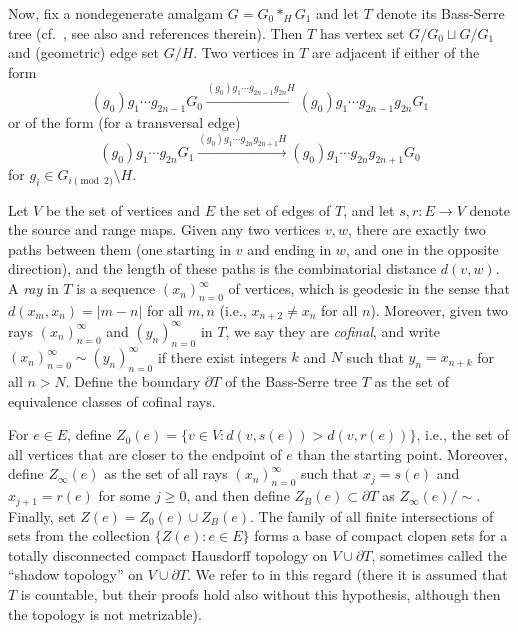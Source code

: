 \documentclass[a4paper]{amsart}
\theoremstyle{plain}
\theoremstyle{definition}
\theoremstyle{remark}
\numberwithin{theorem}{section}
\begin{document}
\medskip

Now, fix a nondegenerate amalgam $G=G_0*_H G_1$ and let $T$ denote its Bass-Serre tree
(cf.~\cite{Serre}, see also \cite{HP} and references therein).
Then $T$ has vertex set $G/G_0 \sqcup G/G_1$ and (geometric) edge set $G/H$.
Two vertices in $T$ are adjacent if either of the form
\[
(g_0)g_1\dotsm g_{2n-1} G_0 \xrightarrow{(g_0)g_1\dotsm g_{2n-1}g_{2n}H} (g_0)g_1\dotsm g_{2n-1}g_{2n} G_1
\]
or of the form (for a transversal edge)
\[
(g_0)g_1\dotsm g_{2n} G_1 \xrightarrow{(g_0)g_1\dotsm g_{2n}g_{2n+1}H} (g_0)g_1\dotsm g_{2n}g_{2n+1} G_0
\]
for $g_i\in G_{i\pmod 2}\setminus H$.

Let $V$ be the set of vertices and $E$ the set of edges of $T$, and let $s,r\colon E\to V$ denote the source and range maps.
Given any two vertices $v,w$, there are exactly two paths between them (one starting in $v$ and ending in $w$, and one in the opposite direction),
and the length of these paths is the combinatorial distance $d(v,w)$.
A \emph{ray} in $T$ is a sequence $(x_n)_{n=0}^\infty$ of vertices,
which is geodesic in the sense that $d(x_m,x_n)=\lvert m-n\rvert$ for all $m,n$ (i.e., $x_{n+2}\neq x_n$ for all $n$).
Moreover, given two rays $(x_n)_{n=0}^\infty$ and $(y_n)_{n=0}^\infty$ in $T$, we say they are \emph{cofinal},
and write $(x_n)_{n=0}^\infty \sim (y_n)_{n=0}^\infty$ if there exist integers $k$ and $N$ such that $y_n=x_{n+k}$ for all $n>N$.
Define the boundary $\partial T$ of the Bass-Serre tree $T$ as the set of equivalence classes of cofinal rays.

For $e\in E$, define $Z_0(e)=\{v\in V : d(v,s(e))>d(v,r(e))\}$, i.e., the set of all vertices that are closer to the endpoint of $e$ than the starting point.
Moreover, define $Z_\infty(e)$ as the set of all rays $(x_n)_{n=0}^\infty$ such that $x_j=s(e)$ and $x_{j+1}=r(e)$ for some $j\geq 0$,
and then define $Z_B(e)\subset\partial T$ as $Z_\infty(e)/\sim$.
Finally, set $Z(e)=Z_0(e) \cup Z_B(e)$.
The family of all finite intersections of sets from the collection $\{Z(e) : e\in E\}$
forms a base of compact clopen sets for a totally disconnected compact Hausdorff topology on $V\cup\partial T$,
sometimes called the ``shadow topology'' on $V\cup\partial T$.
We refer to \cite[Section~4, especially Proposition~4.4]{MS} in this regard
(there it is assumed that $T$ is countable, but their proofs hold also without this hypothesis, although then the topology is not metrizable).
\end{document}
